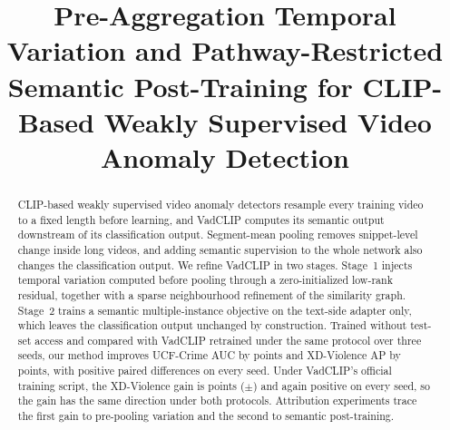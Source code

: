 \documentclass[conference]{IEEEtran}
\title{Pre-Aggregation Temporal Variation and Pathway-Restricted Semantic Post-Training for CLIP-Based Weakly Supervised Video Anomaly Detection}
\author{\IEEEauthorblockN{Anonymous}}
\begin{document}
\maketitle

\begin{abstract}
CLIP-based weakly supervised video anomaly detectors resample every training video to a fixed length before learning, and VadCLIP computes its semantic output downstream of its classification output. Segment-mean pooling removes snippet-level change inside long videos, and adding semantic supervision to the whole network also changes the classification output. We refine VadCLIP in two stages. Stage~1 injects temporal variation computed before pooling through a zero-initialized low-rank residual, together with a sparse neighbourhood refinement of the similarity graph. Stage~2 trains a semantic multiple-instance objective on the text-side adapter only, which leaves the classification output unchanged by construction. Trained without test-set access and compared with VadCLIP retrained under the same protocol over three seeds, our method improves UCF-Crime AUC by \ucfGainMean{} points and XD-Violence AP by \xdGainMean{} points, with positive paired differences on every seed. Under VadCLIP's official training script, the XD-Violence gain is \offGainMean{} points ($\pm$\offGainSd{}) and again positive on every seed, so the gain has the same direction under both protocols. Attribution experiments trace the first gain to pre-pooling variation and the second to semantic post-training.
\end{abstract}














\end{document}
